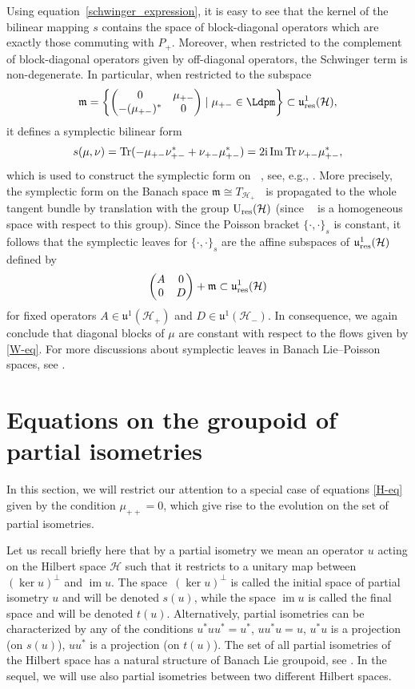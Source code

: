 \documentclass[pdftex]{sigma}
\theoremstyle{definition}
\numberwithin{equation}{section}
\renewcommand{\H}{\mathcal{H}}
\DeclareMathOperator{\Gr}{Gr_{res}(\H,\H_+)}
\newcommand{\Ur}{\mathrm{U}_{\textnormal{res}}(\H)}
\newcommand{\uujp}{\mathfrak u^1(\H_+)}\newcommand{\uujm}{\mathfrak u^1(\H_-)}
\newcommand{\urp}{\mathfrak u_{\textnormal{res}}^1(\H)}
\DeclareMathOperator{\Tr}{Tr}
\DeclareMathOperator{\im}{im}
\newcommand{\pb}{\{\cdot,\cdot\}}
\begin{document}
Using equation~\eqref{schwinger_expression}, it is easy to see that the kernel of the bilinear mapping $s$ contains the space of block-diagonal operators which are exactly those commuting with $P_+$. Moreover, when restricted to the complement of block-diagonal operators given by off-diagonal operators, the Schwinger term is non-degenerate. In particular, when restricted to the subspace
\[
\mathfrak{m} =
\left\{\left(
\begin{matrix}
 0 & \mu_{+-}\\
 -(\mu_{+-})^* & 0\\
\end{matrix}
\right) \mid \mu_{+-}\in\Ldpm\right\}\subset \urp,
\]
it defines a symplectic bilinear form
\[
s(\mu,\nu)=\Tr(-\mu_{+-}\nu^*_{+-}+\nu_{+-}\mu^*_{+-}) = 2{\rm i} \operatorname{Im} \Tr \nu_{+-}\mu^*_{+-},
\]
which is used to construct the symplectic form on $\Gr$, see, e.g., \cite{Ratiu-grass,wurzbacher}. More precisely, the symplectic form on the Banach space $\mathfrak{m}\cong T_{\H_+}\Gr$ is propagated to the whole tangent bundle by translation with the group $\Ur$ (since $\Gr$ is a homogeneous space with respect to this group).
Since the Poisson bracket $\pb_s$ is constant, it follows that the symplectic leaves for $\pb_s$ are the affine subspaces of $\urp$ defined by %
\[
\left(
\begin{matrix}
 A & 0\\
 0 & D
\end{matrix}
\right) + \mathfrak m \subset \urp \]
for fixed operators $A\in\uujp$ and $D\in\uujm$.
In consequence, we again conclude that diagonal blocks of $\mu$ are constant with respect to the flows given by \eqref{W-eq}. For more discussions about symplectic leaves in Banach Lie--Poisson spaces, see \cite{beltita05}.

\section{Equations on the groupoid of partial isometries}\label{sec:partiso}

In this section, we will restrict our attention to a special case of equations \eqref{H-eq} given by the condition $\mu_{++}=0$, which give rise to the evolution on the set of partial isometries.

Let us recall briefly here that by a partial isometry we mean an operator $u$ acting on the Hilbert space $\H$ such that it restricts to a unitary map between $(\ker u)^\perp$ and $\im u$. The space~$(\ker u)^\perp$ is called the initial space of partial isometry $u$ and will be denoted $s(u)$, while the space $\im u$ is called the final space and will be denoted $t(u)$. Alternatively, partial isometries can be characterized by any of the conditions
$u^*uu^*=u^*$, $uu^*u=u$, $ u^*u$ is a projection (on $ s(u)$), $uu^*$ is a projection (on $t(u)$).
The set of all partial isometries of the Hilbert space has a natural structure of Banach Lie groupoid, see \cite{OS}. In the sequel, we will use also partial isometries between two different Hilbert spaces.
\end{document}

